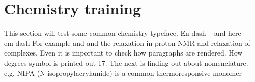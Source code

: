 






\section{Chemistry training} %
This section will test some common chemistry typeface. En dash -- and here --- em dash 
For example  and 
 and the relaxation in proton  NMR and relaxation of  complexes. Even it is important to check how
  paragraphs are rendered. How degrees symbol is printed out 17\degc. 
  The next is finding out about nomenclature. e.g. NIPA (N-isopropylacrylamide) is a common thermoresponsive monomer 
 

  
  
  
